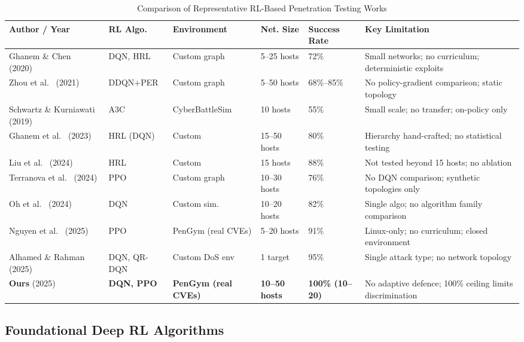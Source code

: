 \documentclass[conference]{IEEEtran}
\begin{document}
\begin{table}[t]
\centering
\caption{Comparison of Representative RL-Based Penetration Testing Works}
\label{tab:relatedwork}
\renewcommand{\arraystretch}{1.15}
\begin{tabular}{p{3.1cm} p{1.6cm} p{2.4cm} p{1.6cm} p{1.6cm} p{4.5cm}}
\toprule
\textbf{Author / Year} & \textbf{RL Algo.} & \textbf{Environment} &
\textbf{Net. Size} & \textbf{Success Rate} & \textbf{Key Limitation} \\
\midrule
Ghanem \& Chen~\cite{ghanem2020reinforcement} (2020)
  & DQN, HRL & Custom graph & 5--25 hosts & 72\% & Small networks; no curriculum; deterministic exploits \\
Zhou et al.~\cite{zhou2021autonomous} (2021)
  & DDQN+PER & Custom graph & 5--50 hosts & 68\%--85\% & No policy-gradient comparison; static topology \\
Schwartz \& Kurniawati~\cite{schwartz2019autonomous} (2019)
  & A3C & CyberBattleSim & 10 hosts & 55\% & Small scale; no transfer; on-policy only \\
Ghanem et al.~\cite{ghanem2023jiis} (2023)
  & HRL (DQN) & Custom & 15--50 hosts & 80\% & Hierarchy hand-crafted; no statistical testing \\
Liu et al.~\cite{liu2024electronics} (2024)
  & HRL & Custom & 15 hosts & 88\% & Not tested beyond 15 hosts; no ablation \\
Terranova et al.~\cite{terranova2024raid} (2024)
  & PPO & Custom graph & 10--30 hosts & 76\% & No DQN comparison; synthetic topologies only \\
Oh et al.~\cite{oh2024electronics} (2024)
  & DQN & Custom sim. & 10--20 hosts & 82\% & Single algo; no algorithm family comparison \\
Nguyen et al.~\cite{nguyen2025cose} (2025)
  & PPO & PenGym (real CVEs) & 5--20 hosts & 91\% & Linux-only; no curriculum; closed environment \\
Alhamed \& Rahman~\cite{alhamed2025ijacsa} (2025)
  & DQN, QR-DQN & Custom DoS env & 1 target & 95\% & Single attack type; no network topology \\
\textbf{Ours} (2025)
  & \textbf{DQN, PPO} & \textbf{PenGym (real CVEs)} & \textbf{10--50 hosts} & \textbf{100\% (10--20)} &
  No adaptive defence; 100\% ceiling limits discrimination \\
\bottomrule
\end{tabular}
\end{table}

\subsection{Foundational Deep RL Algorithms}
\end{document}
